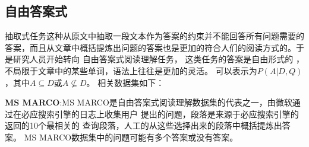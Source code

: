 %
\subsection{自由答案式}
抽取式任务这种从原文中抽取一段文本作为答案的约束并不能回答所有问题需要的答案，而且从文章中概括提炼出问题的答案也是更加的符合人们的阅读方式的。于是研究人员开始转向
自由答案式阅读理解任务，
这类任务的答案是自由形式的
，不局限于文章中的某些单词，语法上往往是更加的灵活。
可以表示为$P(A|D,Q)$，其中$A\subseteq D$或$A\nsubseteq D$。
相关数据集如下：

\textbf{MS MARCO}:\quad MS MARCO是自由答案式阅读理解数据集的代表之一，由微软通过在必应搜索引擎的日志上收集用户
提出的问题，段落是来源于必应搜索引擎的返回的10个最相关的
查询段落，人工的从这些选择出来的段落中概括提炼出答案。
MS MARCO数据集中的问题可能有多个答案或没有答案。

